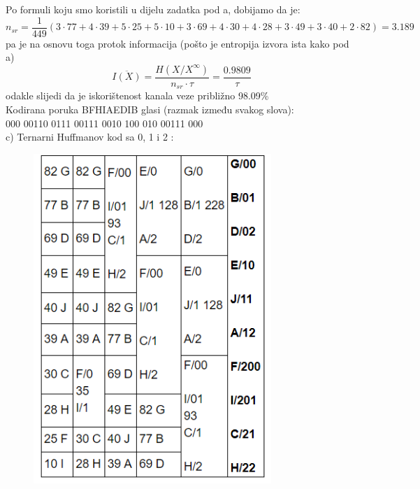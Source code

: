 \documentclass[12pt]{article}
\begin{document}
\begin{enumerate}
 Po formuli koju smo koristili u dijelu zadatka pod a, dobijamo da je:
\begin{equation*}
    n_{sr} = \frac{1}{449}(3 \cdot 77 + 4 \cdot 39 + 5 \cdot 25 + 5 \cdot 10 + 3 \cdot 69 +
    4 \cdot 30 + 4 \cdot 28 + 3 \cdot 49 + 3 \cdot 40 + 2 \cdot 82) = 3.189
\end{equation*}
pa je na osnovu toga protok informacija (pošto je entropija izvora ista kako pod a)\\
\begin{equation*}
    \overline{I(X)} = \frac{H(X/X^\infty)}{n_{sr} \cdot \tau} = \frac{0.9809}{\tau}
\end{equation*}
odakle slijedi da je iskorištenost kanala veze približno 98.09\% \\


Kodirana poruka BFHIAEDIB glasi (razmak između svakog slova): \\
000 00110 0111 00111 0010 100 010 00111 000 \\

c) Ternarni Huffmanov kod sa 0, 1 i 2 : \\

\begin{figure}[htp]
    \centering
    \includegraphics[width=9cm]{5c.png}
\end{figure}


\end{enumerate}
\end{document}
